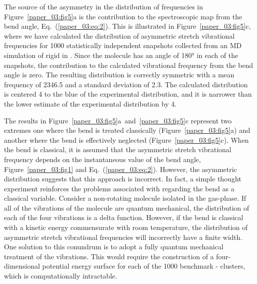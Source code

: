 \documentclass[%
  class = book,%
  crop = false,%
  float = true,%
  multi = true,%
  preview = false,%
]{standalone}
\begin{document}
The source of the asymmetry in the distribution of frequencies in Figure~\ref{paper_03:fig5}a is the contribution to the spectroscopic map from the  bend angle, Eq.~(\ref{paper_03:eq:2}). This is illustrated in Figure~\ref{paper_03:fig5}c, where we have calculated the distribution of  asymmetric stretch vibrational frequencies for 1000 statistically independent snapshots collected from an MD simulation of rigid  in \ce{[C4C1im][PF6]}. Since the  molecule has an angle of \ang{180} in each of the snapshots, the contribution to the calculated vibrational frequency from the  bend angle is zero. The resulting distribution is correctly symmetric with a mean frequency of \SI{2346.5}{\wavenumber} and a standard deviation of \SI{2.3}{\wavenumber}. The calculated distribution is centered \SI{4}{\wavenumber} to the blue of the experimental distribution, and it is narrower than the lower estimate of the experimental distribution by \SI{4}{\wavenumber}.

The results in Figure~\ref{paper_03:fig5}a~and~\ref{paper_03:fig5}c represent two extremes \textemdash{} one where the  bend is treated classically (Figure~\ref{paper_03:fig5}a) and another where the  bend is effectively neglected (Figure~\ref{paper_03:fig5}c). When the  bend is classical, it is assumed that the  asymmetric stretch vibrational frequency depends on the instantaneous value of the bend angle, Figure~\ref{paper_03:fig1} and Eq.~(\ref{paper_03:eq:2}). However, the asymmetric distribution suggests that this approach is incorrect. In fact, a simple thought experiment reinforces the problems associated with regarding the  bend as a classical variable. Consider a non-rotating  molecule isolated in the gas-phase. If all of the vibrations of the  molecule are quantum mechanical, the distribution of each of the four vibrations is a delta function. However, if the bend is classical with a kinetic energy commensurate with room temperature, the distribution of asymmetric stretch vibrational frequencies will incorrectly have a finite width. One solution to this conundrum is to adopt a fully quantum mechanical treatment of the  vibrations. This would require the construction of a four-dimensional potential energy surface for each of the 1000 benchmark -\ce{[C4C1im][PF6]} clusters, which is computationally intractable.
\end{document}
